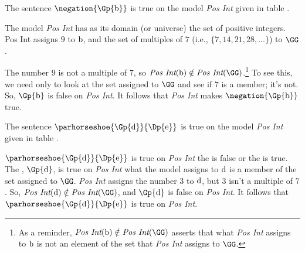\begin{majorILnc}{}
	The sentence $\negation{\Gp{\constant{b}}}$ is true on the model \emph{Pos Int} given in table . 
\end{majorILnc}
\begin{PROOF}
	The model \emph{Pos Int} has as its domain (or universe) the set of positive integers.  
	Pos Int assigns $9$ to $\mathrm{b}$, and the set of multiples of $7$ (i.e., $\{7, 14, 21, 28, ...\}$) to $\GG$. 
	
	The number $9$ is not a multiple of $7$, so $\emph{Pos Int}(\constant{b})\notin\emph{Pos Int}(\GG)$.\footnote{As a reminder, $\emph{Pos Int}(\constant{b})\notin\emph{Pos Int}(\GG)$ asserts that what \emph{Pos Int} assigns to $\mathrm{b}$ is not an element of the set that \emph{Pos Int} assigns to $\GG$.}  To see this, we need only to look at the set assigned to $\GG$ and see if $7$ is a member; it's not.  So, $\Gp{\constant{b}}$ is false on \emph{Pos Int}.  It follows that \emph{Pos Int} makes $\negation{\Gp{\constant{b}}}$ true. 
\end{PROOF}

\begin{majorILnc}{}
The sentence ${\parhorseshoe{\Gp{\constant{d}}}{\Dp{\constant{e}}}}$ is true on the model \emph{Pos Int} given in table . 
\end{majorILnc}
\begin{PROOF}
$\parhorseshoe{\Gp{\constant{d}}}{\Dp{\constant{e}}}$ is true on \emph{Pos Int} \Iff the  is false or the  is true.  The , $\Gp{\constant{d}}$, is true on \emph{Pos Int} \Iff what the model assigns to $\mathrm{d}$ is a member of the set assigned to $\GG$.  \emph{Pos Int} assigns the number $3$ to $\mathrm{d}$, but $3$ isn't a multiple of $7$.  So, $\emph{Pos Int}(\constant{d})\notin\emph{Pos Int}(\GG)$, and $\Gp{\constant{d}}$ is false on \emph{Pos Int}.  It follows that $\parhorseshoe{\Gp{\constant{d}}}{\Dp{\constant{e}}}$ is true on \emph{Pos Int}.
\end{PROOF}

